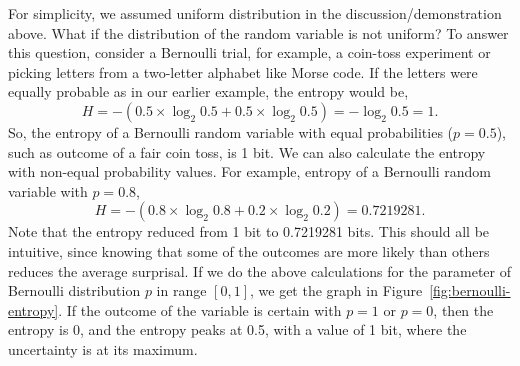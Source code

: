 \begin{marginfigure}
  \caption{\label{fig:bernoulli-entropy}%
    Entropy of Bernoulli random variables (in bits)
    as a function of the parameter $p$. 
  }
\end{marginfigure}
For simplicity,
we assumed uniform distribution in the discussion/demonstration above.
What if the distribution of the random variable is not uniform?
To answer this question,
consider a Bernoulli trial, for example,
a coin-toss experiment or 
picking letters from a two-letter alphabet like Morse code.
If the letters were equally probable as in our earlier example,
the entropy would be,
\[
  H = - \left(0.5 \times \log_{2} 0.5 + 0.5 \times \log_{2} 0.5 \right)
  = - \log_{2} 0.5 = 1.
\]
So, the entropy of a Bernoulli random variable with equal probabilities ($p = 0.5$),
such as outcome of a fair coin toss, is \num{1} bit.
We can also calculate the entropy with non-equal probability values.
For example, entropy of a Bernoulli random variable with $p=0.8$,
\[
  H = - \left(0.8 \times \log_{2} 0.8 + 0.2 \times \log_{2} 0.2 \right)
  = \num{0.7219281} .
\]
Note that the entropy reduced from 1 bit to \num{0.7219281} bits.
This should all be intuitive,
since knowing that some of the outcomes are more likely than others reduces
the average surprisal.
If we do the above calculations for the parameter of Bernoulli distribution
$p$ in range $[0, 1]$,
we get the graph in Figure~\ref{fig:bernoulli-entropy}.
If the outcome of the variable is certain with $p = 1$ or $p = 0$,
then the entropy is \num{0},
and the entropy peaks at \num[round-precision=1]{0.5},
with a value of \num{1} bit,
where the uncertainty is at its maximum.

